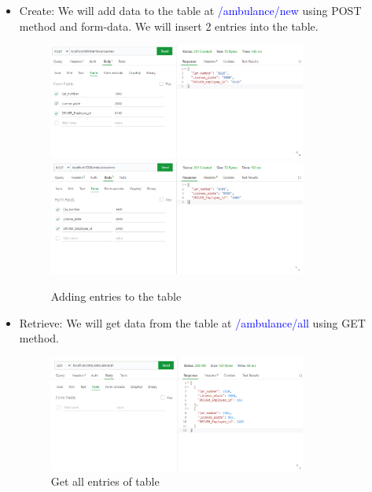 \documentclass[a4paper]{article}
\numberwithin{equation}{section}
\begin{document}
\begin{itemize}
    \item Create:
    We will add data to the table at \textcolor{blue}{/ambulance/new} using POST method and form-data.
    We will insert 2 entries into the table.
    \begin{figure}[H]
        \centering
        \includegraphics[width=0.8\textwidth]{./assets/api_new1.png}
        \includegraphics[width=0.8\textwidth]{./assets/api_new2.png}
        \caption{Adding entries to the table}
    \end{figure}

        \item Retrieve:
    We will get data from the table at \textcolor{blue}{/ambulance/all} using GET method.
    \begin{figure}[H]
        \centering
        \includegraphics[width=0.8\textwidth]{./assets/api_all.png}
        \caption{Get all entries of table}
    \end{figure}


\end{itemize}
\end{document}
